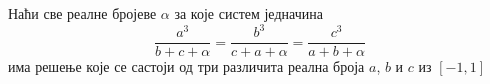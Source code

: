 Наћи све реалне бројеве $\alpha$ за које систем једначина 
\[
    \frac{a^3}{b + c + \alpha}
=
    \frac{b^3}{c + a + \alpha}
=
    \frac{c^3}{a + b + \alpha}
\]
има решење које се састоји од три различита реална броја $a$, $b$ и $c$ из
$[-1, 1]$

\solution

